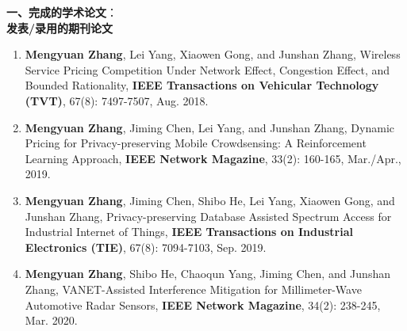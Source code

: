 \textbf{一、完成的学术论文}：\\

\textbf{{发表/录用的期刊论文}}

\begin{enumerate}
\item \textbf{Mengyuan Zhang}, Lei Yang, Xiaowen Gong, and Junshan Zhang, Wireless Service Pricing Competition Under Network Effect, Congestion Effect, and Bounded Rationality, \textbf{IEEE Transactions on Vehicular Technology (TVT)}, 67(8): 7497-7507, Aug. 2018.
\item \textbf{Mengyuan Zhang}, Jiming Chen, Lei Yang, and Junshan Zhang, Dynamic Pricing for Privacy-preserving Mobile Crowdsensing: A Reinforcement Learning Approach, \textbf{IEEE Network Magazine}, 33(2): 160-165, Mar./Apr., 2019.
\item  \textbf{Mengyuan Zhang}, Jiming Chen, Shibo He, Lei Yang, Xiaowen Gong, and Junshan Zhang, Privacy-preserving Database Assisted Spectrum Access for Industrial Internet of Things, \textbf{IEEE Transactions on Industrial Electronics (TIE)}, 67(8): 7094-7103, Sep. 2019.
\item  \textbf{Mengyuan Zhang}, Shibo He, Chaoqun Yang, Jiming Chen, and Junshan Zhang, VANET-Assisted Interference Mitigation for Millimeter-Wave Automotive Radar Sensors, \textbf{IEEE Network Magazine}, 34(2): 238-245, Mar. 2020.
\end{enumerate}

